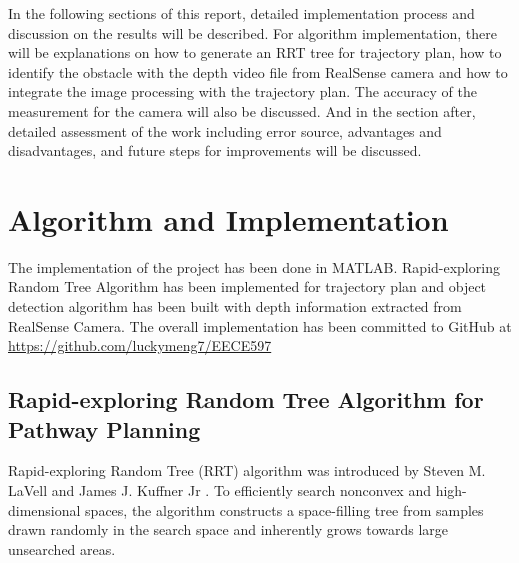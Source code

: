\documentclass[
  oneside]{ubcthesis}
\begin{document}
In the following sections of this report, detailed implementation process and discussion on the results will be described. For algorithm implementation, there will be explanations on how to generate an RRT tree for trajectory plan, how to identify the obstacle with the depth video file from RealSense camera and how to integrate the image processing with the trajectory plan. The accuracy of the measurement for the camera will also be discussed. And in the section after, detailed assessment of the work including error source, advantages and disadvantages, and future steps for improvements will be discussed.

\hypertarget{algorithm-and-implementation}{%
\chapter{Algorithm and Implementation}\label{algorithm-and-implementation}}

The implementation of the project has been done in MATLAB. Rapid-exploring Random Tree Algorithm has been implemented for trajectory plan and object detection algorithm has been built with depth information extracted from RealSense Camera. The overall implementation has been committed to GitHub at \url{https://github.com/luckymeng7/EECE597}

\hypertarget{rapid-exploring-random-tree-algorithm-for-pathway-planning}{%
\section{Rapid-exploring Random Tree Algorithm for Pathway Planning}\label{rapid-exploring-random-tree-algorithm-for-pathway-planning}}

Rapid-exploring Random Tree (RRT) algorithm was introduced by Steven M. LaVell and James J. Kuffner Jr \citep{rrt}. To efficiently search nonconvex and high-dimensional spaces, the algorithm constructs a space-filling tree from samples drawn randomly in the search space and inherently grows towards large unsearched areas.
\end{document}
